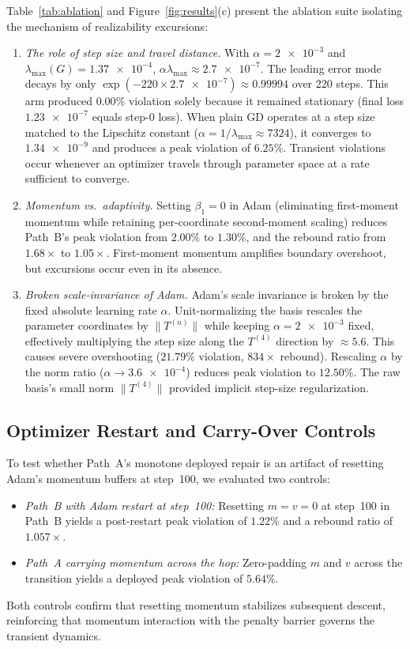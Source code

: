 \documentclass[preprint,aps,prb,longbibliography,superscriptaddress]{revtex4-2}
\begin{document}
Table~\ref{tab:ablation} and Figure~\ref{fig:results}(c) present the ablation
suite isolating the mechanism of realizability excursions:
\begin{enumerate}
  \item \textit{The role of step size and travel distance.}
    With $\alpha = \num{2e-3}$ and $\lambda_{\max}(G) = \num{1.37e-4}$,
    $\alpha\lambda_{\max} \approx \num{2.7e-7}$. The leading error mode decays
    by only $\exp(-220 \times \num{2.7e-7}) \approx 0.99994$ over 220 steps.
    This arm produced $0.00\%$ violation solely because it remained stationary
    (final loss $\num{1.23e-7}$ equals step-0 loss).
    When plain GD operates at a step size matched to the Lipschitz constant
    ($\alpha = 1/\lambda_{\max} \approx 7324$), it converges to $\num{1.34e-9}$
    and produces a peak violation of $6.25\%$. Transient violations occur
    whenever an optimizer travels through parameter space at a rate sufficient
    to converge.
  \item \textit{Momentum vs.\ adaptivity.}
    Setting $\beta_1 = 0$ in Adam (eliminating first-moment momentum while
    retaining per-coordinate second-moment scaling) reduces Path~B's peak
    violation from $2.00\%$ to $1.30\%$, and the rebound ratio from $1.68\times$
    to $1.05\times$. First-moment momentum amplifies boundary overshoot, but
    excursions occur even in its absence.
  \item \textit{Broken scale-invariance of Adam.}
    Adam's scale invariance is broken by the fixed absolute learning rate $\alpha$.
    Unit-normalizing the basis rescales the parameter coordinates by
    $\|T^{(n)}\|$ while keeping $\alpha = \num{2e-3}$ fixed, effectively
    multiplying the step size along the $T^{(4)}$ direction by $\approx 5.6$.
    This causes severe overshooting ($21.79\%$ violation, $834\times$ rebound).
    Rescaling $\alpha$ by the norm ratio ($\alpha \to \num{3.6e-4}$) reduces peak
    violation to $12.50\%$. The raw basis's small norm $\|T^{(4)}\|$ provided
    implicit step-size regularization.
\end{enumerate}

\subsection{Optimizer Restart and Carry-Over Controls}
\label{sec:controls}

To test whether Path~A's monotone deployed repair is an artifact of resetting
Adam's momentum buffers at step~100, we evaluated two controls:
\begin{itemize}
  \item \textit{Path~B with Adam restart at step~100:} Resetting $m=v=0$ at
    step~100 in Path~B yields a post-restart peak violation of $1.22\%$ and a
    rebound ratio of $1.057\times$.
  \item \textit{Path~A carrying momentum across the hop:} Zero-padding $m$ and
    $v$ across the transition yields a deployed peak violation of $5.64\%$.
\end{itemize}
Both controls confirm that resetting momentum stabilizes subsequent descent,
reinforcing that momentum interaction with the penalty barrier governs the
transient dynamics.
\end{document}
